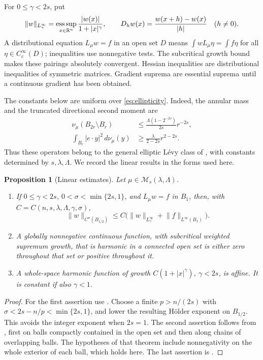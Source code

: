 \documentclass[11pt]{article}
\numberwithin{equation}{section}
\newtheorem{proposition}[theorem]{Proposition}
\theoremstyle{remark}
\newcommand{\R}{\mathbb R}
\newcommand{\norm}[1]{\lVert #1\rVert}
\newcommand{\abs}[1]{\lvert #1\rvert}
\newcommand{\dd}{\,d}
\newcommand{\M}{\mathcal M_{s}(\lambda,\Lambda)}
\begin{document}
For $0\le\gamma<2s$, put
\[
 \norm{w}_{L^\infty_\gamma}
 =\mathop{\rm ess\,sup}_{x\in\R^n}\frac{\abs{w(x)}}{1+\abs{x}^{\gamma}},
 \qquad D_hw(x)=\frac{w(x+h)-w(x)}{\abs h}\quad(h\ne0).
\]
A distributional equation $L_\mu w=f$ in an open set $D$ means
$\int wL_\mu\eta=\int f\eta$ for all $\eta\in C_c^\infty(D)$; inequalities use nonnegative tests. The subcritical growth bound makes these pairings absolutely convergent. Hessian inequalities are distributional inequalities of symmetric matrices. Gradient suprema are essential suprema until a continuous gradient has been obtained.

The constants below are uniform over \eqref{eq:ellipticity}. Indeed, the annular mass and the truncated directional second moment are
\begin{align*}
 \nu_\mu(B_{2r}\setminus B_r)
 &\le\frac{\Lambda(1-2^{-2s})}{2s}r^{-2s},\\
 \int_{B_r}\abs{e\cdot y}^{2}\dd\nu_\mu(y)
 &\ge\frac{\lambda}{2-2s}r^{2-2s}.
\end{align*}
Thus these operators belong to the general elliptic L\'evy class of \cite[Definitions 2.1.18 and 2.1.21]{FRO}, with constants determined by $s,\lambda,\Lambda$. We record the linear results in the forms used here.

\begin{proposition}[Linear estimates]\label{prop:linear}
Let $\mu\in\M$.
\begin{enumerate}
\item If $0\le\gamma<2s$, $0<\sigma<\min\{2s,1\}$, and $L_\mu w=f$ in $B_1$, then, with $C=C(n,s,\lambda,\Lambda,\gamma,\sigma)$,
\begin{equation}\label{eq:interior}
 \norm{w}_{C^\sigma(B_{1/2})}
 \le C\bigl(\norm{w}_{L^\infty_\gamma}+\norm f_{L^\infty(B_1)}\bigr).
\end{equation}
\item A globally nonnegative continuous function, with subcritical weighted supremum growth, that is harmonic in a connected open set is either zero throughout that set or positive throughout it.
\item A whole-space harmonic function of growth $C(1+\abs{x}^{\gamma})$, $\gamma<2s$, is affine. It is constant if also $\gamma<1$.
\end{enumerate}
\end{proposition}
\begin{proof}
For the first assertion use \cite[Theorem 2.4.3]{FRO}. Choose a finite $p>n/(2s)$ with
$\sigma<2s-n/p<\min\{2s,1\}$, and lower the resulting H\"older exponent on $B_{1/2}$. This avoids the integer exponent when $2s=1$. The second assertion follows from \cite[Theorem 2.4.15(b)]{FRO}, first on balls compactly contained in the open set and then along chains of overlapping balls. The hypotheses of that theorem include nonnegativity on the whole exterior of each ball, which holds here. The last assertion is \cite[Corollary 2.4.14]{FRO}.
\end{proof}
\end{document}
